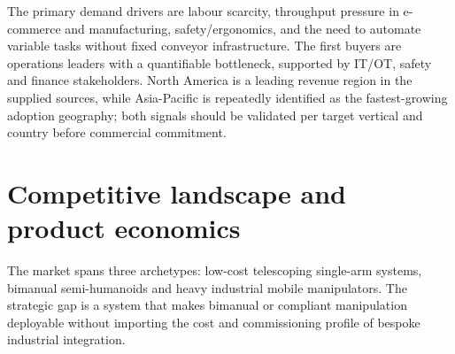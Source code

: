 \documentclass[11pt,a4paper]{article}
\begin{document}
The primary demand drivers are labour scarcity, throughput pressure in e-commerce and manufacturing, safety/ergonomics, and the need to automate variable tasks without fixed conveyor infrastructure. The first buyers are operations leaders with a quantifiable bottleneck, supported by IT/OT, safety and finance stakeholders. North America is a leading revenue region in the supplied sources, while Asia-Pacific is repeatedly identified as the fastest-growing adoption geography; both signals should be validated per target vertical and country before commercial commitment.\cite{bri,gvr}

\begin{center}
\end{center}

\section{Competitive landscape and product economics}

The market spans three archetypes: low-cost telescoping single-arm systems, bimanual semi-humanoids and heavy industrial mobile manipulators. The strategic gap is a system that makes bimanual or compliant manipulation deployable without importing the cost and commissioning profile of bespoke industrial integration.
\end{document}

